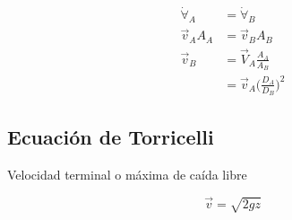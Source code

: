 \[
    \begin{split}
        \dot{ \forall }_A & = \dot{ \forall }_B \\
        \vec{v}_{A} A_{A} & = \vec{v}_{B} A_{B} \\
        \vec{v}_{B} & = \vec{V}_{A} \frac{ A_{A} }{ A_{B} } \\
        & = \vec{v}_{A} \Big( \frac{ D_{A} }{ D_{B} } \Big)^{2}
    \end{split}
\]

\subsection{Ecuación de Torricelli}

Velocidad terminal o máxima de caída libre

\[
    \vec{ v } = \sqrt{ 2gz }
\]